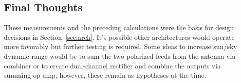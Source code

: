 \documentclass[titlepage]{article}
\begin{document}
\subsection{Final Thoughts}
These measurements and the preceding calculations were the basis for design decisions in Section~\ref{sec:arch}. It's possible other architectures would operate more favorably but further testing is required. Some ideas to increase sun/sky dynamic range would be to sum the two polarized feeds from the antenna via combiner or to create dual-channel rectifier and combine the outputs via summing op-amp, however, these remain as hypotheses at the time.
\end{document}
